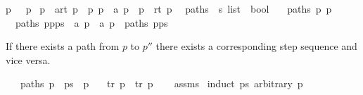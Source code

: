 \begin{isabellebody}
{\isacartoucheopen}p\ {\isasymmapsto}{\isachardollar}{\kern0pt}\ {\isacharbrackleft}{\kern0pt}{\isacharbrackright}{\kern0pt}\ p{\isacartoucheclose}\ {\isacharbar}{\kern0pt}\isanewline
{\isacartoucheopen}p\ {\isasymmapsto}{\isachardollar}{\kern0pt}\ {\isacharparenleft}{\kern0pt}a{\isacharhash}{\kern0pt}rt{\isacharparenright}{\kern0pt}\ p{\isacharprime}{\kern0pt}{\isacharprime}{\kern0pt}{\isacartoucheclose}\ \ {\isacartoucheopen}{\isasymexists}p{\isacharprime}{\kern0pt}{\isachardot}{\kern0pt}\ p\ {\isasymmapsto}\ a\ p{\isacharprime}{\kern0pt}\ {\isasymand}\ p{\isacharprime}{\kern0pt}\ {\isasymmapsto}{\isachardollar}{\kern0pt}\ rt\ p{\isacharprime}{\kern0pt}{\isacharprime}{\kern0pt}{\isacartoucheclose}\ \isanewline
\isanewline
{}\isamarkupfalse%
\ paths\ {\isacharcolon}{\kern0pt}{\isacharcolon}{\kern0pt}\ {\isacartoucheopen}{\isacharprime}{\kern0pt}s\ list\ {\isasymRightarrow}\ bool{\isacartoucheclose}\ \isanewline
\ \ {\isacartoucheopen}paths\ {\isacharbrackleft}{\kern0pt}p{\isacharcomma}{\kern0pt}\ p{\isacharbrackright}{\kern0pt}{\isacartoucheclose}\ {\isacharbar}{\kern0pt}\isanewline
\ \ {\isacartoucheopen}paths\ {\isacharparenleft}{\kern0pt}p{\isacharhash}{\kern0pt}p{\isacharprime}{\kern0pt}{\isacharhash}{\kern0pt}ps{\isacharparenright}{\kern0pt}{\isacartoucheclose}\ \ {\isacartoucheopen}{\isasymexists}a{\isachardot}{\kern0pt}\ p\ {\isasymmapsto}\ a\ p{\isacharprime}{\kern0pt}\ {\isasymand}\ paths\ {\isacharparenleft}{\kern0pt}p{\isacharprime}{\kern0pt}{\isacharhash}{\kern0pt}ps{\isacharparenright}{\kern0pt}{\isacartoucheclose}%
\begin{isamarkuptext}%
If there exists a path from $p$ to $p''$ there exists a corresponding step sequence and vice versa.%
\end{isamarkuptext}\isamarkuptrue%
\isamarkupfalse%
\isanewline
\ \ \ {\isacartoucheopen}paths\ {\isacharparenleft}{\kern0pt}p\ {\isacharhash}{\kern0pt}\ ps\ {\isacharat}{\kern0pt}\ {\isacharbrackleft}{\kern0pt}p{\isacharprime}{\kern0pt}{\isacharprime}{\kern0pt}{\isacharbrackright}{\kern0pt}{\isacharparenright}{\kern0pt}{\isacartoucheclose}\isanewline
\ \ \ {\isacartoucheopen}{\isasymexists}tr{\isachardot}{\kern0pt}\ p\ {\isasymmapsto}{\isachardollar}{\kern0pt}\ tr\ p{\isacharprime}{\kern0pt}{\isacharprime}{\kern0pt}{\isacartoucheclose}\isanewline
%
\isadelimproof
\ \ %
\endisadelimproof
%
\isatagproof
{}\isamarkupfalse%
\ assms\isanewline
{}\isamarkupfalse%
\ {\isacharparenleft}{\kern0pt}induct\ ps\ arbitrary{\isacharcolon}{\kern0pt}\ p{\isacharparenright}{\kern0pt}\isanewline

\end{isabellebody}
